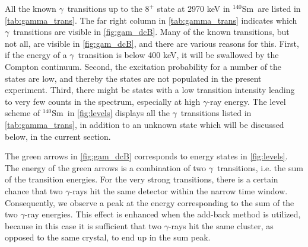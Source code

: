 \documentclass[twoside,english]{uiofysmaster/uiofysmaster}
\newcommand{\Sm}{$^{140}$Sm} %
\newcommand{\ga}{$\gamma$}
\let\orgautoref\autoref
\renewcommand{\autoref}
        {%
		 \def\sectionautorefname{Section}%
		 \def\subsectionautorefname{Section}%
		 \def\subsubsectionautorefname{Section}%
		 \def\chapterautorefname{Chapter}%
          \orgautoref}
\begin{document}
All the known \ga\ transitions up to the $8^+$ state at 2970 keV in \Sm\ are listed in \autoref{tab:gamma_trans}. 
The far right column in \autoref{tab:gamma_trans} indicates which \ga\ transitions are visible in \autoref{fig:gam_dcB}.
Many of the known transitions, but not all, are visible in \autoref{fig:gam_dcB}, and there are various reasons for this.
First, if the energy of a \ga\ transition is below 400 keV, it will be swallowed by the Compton continuum.
Second, the excitation probability for a number of the states are low, and thereby the states are not populated in the present experiment.
Third, there might be states with a low transition intensity leading to very few counts in the spectrum, especially at high \ga-ray energy.
The level scheme of \Sm\ in \autoref{fig:levels} displays all the \ga\ transitions listed in  \autoref{tab:gamma_trans}, in addition to an unknown state which will be discussed below, in the current section. 


\begin{table}[ht] 
    \centering 
    \caption{Known \ga\ transitions in \Sm\ based on \cite{Klintefjord, NNDC-levels}. 
    $E$ refers to the energy, $J^\pi$ is the spin and parity and $\sigma \lambda$ is the multipolarity. 
    $I_\gamma$ is the relative \ga\ intensity for transitions depopulating a given state, where the strongest transition is normalized to intensity 100.
    The column "Visible in \ga\ spectrum" describes if it is possible to see the transition in \autoref{fig:gam_dcB}.}
	
	\label{tab:gamma_trans}
\end{table}


The green arrows in \autoref{fig:gam_dcB} corresponds to energy states in \autoref{fig:levels}. 
The energy of the green arrows is a combination of two \ga\ transitions, i.e. the sum of the transition energies.
For the very strong transitions, there is a certain chance that two \ga-rays hit the same detector within the narrow time window. 
Consequently, we observe a peak at the energy corresponding to the sum of the two \ga-ray energies.
This effect is enhanced when the add-back method is utilized, because in this case it is sufficient that two \ga-rays hit the same cluster, as opposed to the same crystal, to end up in the sum peak.
\end{document}
